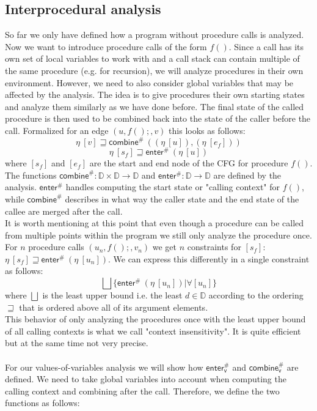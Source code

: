     \subsection{Interprocedural analysis}
    So far we only have defined how a program without procedure calls is analyzed. Now we want to introduce procedure calls of the form $f()$. Since a call has its own set of local variables to work with and a call stack can contain multiple of the same procedure (e.g. for recursion), we will analyze procedures in their own environment. However, we need to also consider global variables that may be affected by the analysis. The idea is to give procedures their own starting states and analyze them similarly as we have done before. The final state of the called procedure is then used to be combined back into the state of the caller before the call. Formalized for an edge $(u, f();, v)$ this looks as follows:
    \[\eta\ [v] \sqsupseteq  \textsf{combine}^{\#}\ ((\eta\ [u]), (\eta\ [e_f])) \]
    \[\eta\ [s_f] \sqsupseteq \textsf{enter}^{\#}\ (\eta\ [u]) \]
    where $[s_f]$ and $[e_f]$ are the start and end node of the CFG for procedure $f()$. The functions $\textsf{combine}^{\#}: \mathbb{D} \times \mathbb{D} \rightarrow \mathbb{D}$ and $\textsf{enter}^{\#}: \mathbb{D} \rightarrow \mathbb{D}$ are defined by the analysis. $\textsf{enter}^{\#}$ handles computing the start state or "calling context" for $f()$, while $\textsf{combine}^{\#}$ describes in what way the caller state and the end state of the callee are merged after the call.\\
    It is worth mentioning at this point that even though a procedure can be called from multiple points within the program we still only analyze the procedure once. For $n$ procedure calls $(u_n, f();, v_n)$ we get $n$ constraints for $[s_f]$: $\eta\ [s_f] \sqsupseteq \textsf{enter}^{\#}\ (\eta\ [u_n])$. We can express this differently in a single constraint as follows:
    \[ \bigsqcup \{ \textsf{enter}^{\#}\ (\eta\ [u_n]) | \forall [u_n] \}\]
    where $\bigsqcup$ is the least upper bound i.e. the least $d \in \mathbb{D}$ according to the ordering $\sqsupseteq$ that is ordered above all of its argument elements.\\
    This behavior of only analyzing the procedures once with the least upper bound of all calling contexts is what we call "context insensitivity". It is quite efficient but at the same time not very precise.\\ 
    \\
    For our values-of-variables analysis we will show how $\textsf{enter}^{\#}_\textsf{v}$ and $\textsf{combine}^{\#}_\textsf{v}$ are defined. We need to take global variables into account when computing the calling context and combining after the call. Therefore, we define the two functions as follows:
